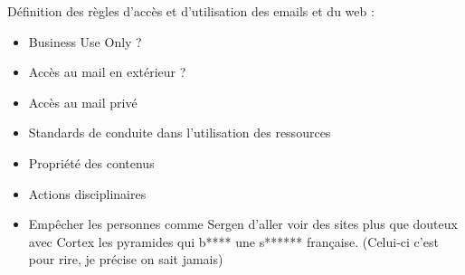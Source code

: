 \documentclass{report}
\begin{document}
Définition des règles d'accès et d'utilisation des emails et du web :

\begin{itemize}
    \item Business Use Only ?
    \item Accès au mail en extérieur ?
    \item Accès au mail privé
    \item Standards de conduite dans l'utilisation des ressources
    \item Propriété des contenus
    \item Actions disciplinaires
    \item Empêcher les personnes comme Sergen d'aller voir des sites plus que douteux avec Cortex les pyramides qui b**** une s****** française. (Celui-ci c'est pour rire, je précise on sait jamais)
\end{itemize}
			
\end{document}
